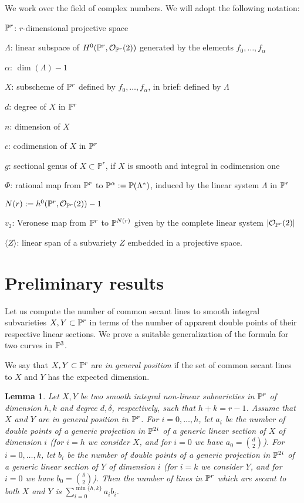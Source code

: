 \documentclass{amsart}
\newtheorem{lemma}{Lemma}
\theoremstyle{definition}
\begin{document}
We work over the field of complex numbers. We will adopt the
following notation:

$\Bbb{P}^{r}$: $r$-dimensional projective space

$\Lambda$: linear subspace of
$H^{0}(\Bbb{P}^{r},\mathcal{O}_{\Bbb{P}^{r}}(2))$ generated by the
elements $f_{0},\dots,f_{\alpha}$

$\alpha$: $\dim (\Lambda )-1$

$X$: subscheme of $\Bbb{P}^{r}$ defined by $f_{0},\dots,f_{\alpha}$,
in brief: defined by $\Lambda$

$d$: degree of $X$ in $\Bbb{P}^{r}$

$n$: dimension of $X$

$c$: codimension of $X$ in $\Bbb{P}^{r}$

$g$: sectional genus of $X\subset{{\mathbb P}}^r$, if $X$ is smooth and
integral in codimension one

$\Phi$: rational map from $\Bbb{P}^{r}$ to
$\Bbb{P}^{\alpha}:=\Bbb{P}(\Lambda ^{*})$, induced by the linear
system $\Lambda$ in $\Bbb{P}^{r}$

$N(r):=h^{0}(\Bbb{P}^{r},\mathcal{O}_{\Bbb{P}^{r}}(2))-1$

$v_{2}$: Veronese map from $\Bbb{P}^{r}$ to $\Bbb{P}^{N(r)}$ given
by the complete linear system $|\mathcal{O}_{\Bbb{P}^{r}}(2)|$

$\langle Z\rangle $: linear span of a subvariety $Z$ embedded in a
projective space.

\section{Preliminary results}\label{section:preliminary}

Let us compute the number of common secant lines to smooth integral
subvarieties $X,Y\subset\Bbb{P}^{r}$ in terms of the number of
apparent double points of their respective linear sections. We prove
a suitable generalization of the formula \cite[p. 297]{gh} for two curves in
$\Bbb{P}^{3}$.

We say that $X,Y\subset\Bbb{P}^r$ are \emph{in general position} if
the set of common secant lines to $X$ and $Y$ has the expected
dimension.

\begin{lemma}\label{lemsec}
Let $X,Y$ be two smooth integral non-linear subvarieties in
$\Bbb{P}^{r}$ of dimension $h,k$ and degree $d,\delta$,
respectively, such that $h+k=r-1$. Assume that $X$ and $Y$ are in
general position in $\Bbb{P}^{r}$. For $i=0,\dots,h$, let $a_{i}$ be
the number of double points of a generic projection in
$\Bbb{P}^{2i}$ of a generic linear section of $X$ of dimension $i$
(for $i=h$ we consider $X$, and for $i=0$ we have
$a_{0}=\binom{d}{2}$). For $ i=0,\dots,k$, let $b_{i}$ be the number
of double points of a generic projection in $\Bbb{P}^{2i}$ of a
generic linear section of $Y$ of dimension $i$ (for $i=k$ we
consider $Y$, and for $i=0$ we have $b_{0}=\binom{\delta}{2}$). Then
the number of lines in $\Bbb{P}^{r}$ which are secant to both $X$
and $Y$ is $\sum\limits_{i=0}^{\min \{h,k\}}a_{i}b_{i}$.
\end{lemma}
\end{document}
